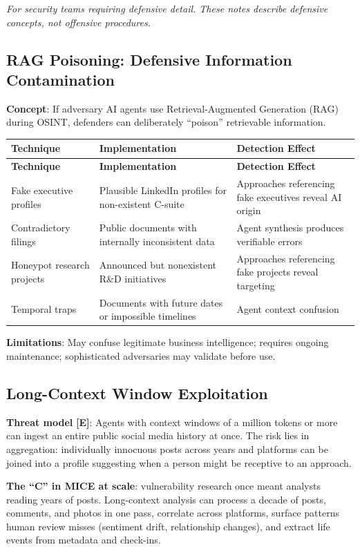 \documentclass[11pt,letterpaper]{article}
\begin{document}
\textit{For security teams requiring defensive detail. These notes describe defensive concepts, not offensive procedures.}

\subsection*{RAG Poisoning: Defensive Information Contamination}

\textbf{Concept}: If adversary AI agents use Retrieval-Augmented Generation (RAG) during OSINT, defenders can deliberately ``poison'' retrievable information.

{\small
\begin{longtable}{L{3.5cm}L{4.5cm}L{4.5cm}}
\toprule
\textbf{Technique} & \textbf{Implementation} & \textbf{Detection Effect} \\
\midrule
\endfirsthead
\toprule
\textbf{Technique} & \textbf{Implementation} & \textbf{Detection Effect} \\
\midrule
\endhead
Fake executive profiles & Plausible LinkedIn profiles for non-existent C-suite & Approaches referencing fake executives reveal AI origin \\*
Contradictory filings & Public documents with internally inconsistent data & Agent synthesis produces verifiable errors \\
Honeypot research projects & Announced but nonexistent R\&D initiatives & Approaches referencing fake projects reveal targeting \\*
Temporal traps & Documents with future dates or impossible timelines & Agent context confusion \\
\bottomrule
\end{longtable}}

\textbf{Limitations}: May confuse legitimate business intelligence; requires ongoing maintenance; sophisticated adversaries may validate before use.

\subsection*{Long-Context Window Exploitation}

\textbf{Threat model} \textbf{[E]}: Agents with context windows of a million tokens or more can ingest an entire public social media history at once. The risk lies in aggregation: individually innocuous posts across years and platforms can be joined into a profile suggesting when a person might be receptive to an approach.

\textbf{The ``C'' in MICE at scale}: vulnerability research once meant analysts reading years of posts. Long-context analysis can process a decade of posts, comments, and photos in one pass, correlate across platforms, surface patterns human review misses (sentiment drift, relationship changes), and extract life events from metadata and check-ins.
\end{document}

